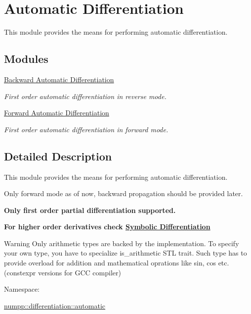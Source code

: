 \hypertarget{group__numpp__differentiation__automatic}{}\section{Automatic Differentiation}
\label{group__numpp__differentiation__automatic}


This module provides the means for performing automatic differentiation.  


\subsection*{Modules}
\begin{DoxyCompactItemize}
\item 
\hyperlink{group__numpp__differentiation__backward__automatic}{Backward Automatic Differentiation}
\begin{DoxyCompactList}\small\item\em First order automatic differentiation in reverse mode. \end{DoxyCompactList}\item 
\hyperlink{group__numpp__differentiation__forward__automatic}{Forward Automatic Differentiation}
\begin{DoxyCompactList}\small\item\em First order automatic differentiation in forward mode. \end{DoxyCompactList}\end{DoxyCompactItemize}


\subsection{Detailed Description}
This module provides the means for performing automatic differentiation. 

Only forward mode as of now, backward propagation should be provided later.

{\bfseries Only first order partial differentiation supported.}

{\bfseries For higher order derivatives check \hyperlink{group__numpp__differentiation__symbolic}{Symbolic Differentiation} }

\begin{DoxyWarning}{Warning}
Only arithmetic types are backed by the implementation. To specify your own type, you have to specialize is\+\_\+arithmetic S\+TL trait. Such type has to provide overload for addition and mathematical oprations like sin, cos etc. (constexpr versions for G\+CC compiler)
\end{DoxyWarning}
Namespace\+: 
\begin{DoxyCode}
\hyperlink{namespacenumpp_1_1differentiation_1_1automatic}{numpp::differentiation::automatic}
\end{DoxyCode}


